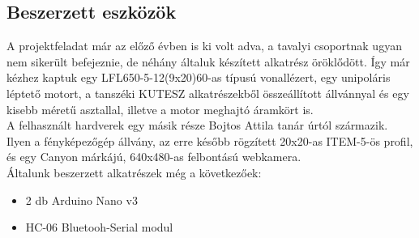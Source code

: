\documentclass[12pt,a4paper]{article}
\begin{document}
\subsection{Beszerzett eszközök}
A projektfeladat már az előző évben is ki volt adva, a tavalyi csoportnak ugyan nem sikerült befejeznie, de néhány általuk készített alkatrész öröklődött. Így már kézhez kaptuk egy  LFL650-5-12(9x20)60-as típusú vonallézert,
egy unipoláris léptető motort, a tanszéki KUTESZ alkatrészekből összeállított állvánnyal és egy kisebb méretű asztallal,
illetve a motor meghajtó áramkört is.
\\[10pt]
A felhasznált hardverek egy másik része Bojtos Attila tanár úrtól származik. Ilyen a fényképezőgép állvány, az erre később rögzített 20x20-as ITEM-5-ös profil, és egy Canyon márkájú, 640x480-as felbontású webkamera.
\\[10pt]
Általunk beszerzett alkatrészek még a következőek: 
\begin{itemize}
	\item 2 db Arduino Nano v3
	\item HC-06 Bluetooh-Serial modul
\end{itemize}
\end{document}
